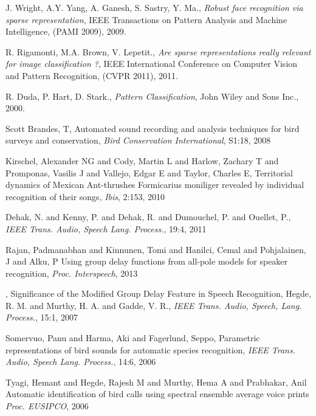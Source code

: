 \documentclass{article}
\begin{document}
\begin{thebibliography}{100}
J. Wright, A.Y. Yang, A. Ganesh, S. Sastry, Y. Ma., \emph{Robust face recognition via sparse representation}, IEEE Transactions on Pattern Analysis and Machine Intelligence, (PAMI 2009), 2009. 

R. Rigamonti, M.A. Brown, V. Lepetit., \emph{Are sparse representations really relevant for image classification ?}, IEEE International Conference on Computer Vision and Pattern Recognition, (CVPR 2011), 2011. 

R. Duda, P. Hart, D. Stark., \emph{Pattern Classification}, John Wiley and Sons Inc., 2000. 











Scott Brandes, T, Automated sound recording and analysis techniques for
bird surveys and conservation, \emph{Bird Conservation International}, S1:18, 2008

Kirschel, Alexander NG and Cody, Martin L and Harlow, Zachary T and Promponas,
Vasilis J and Vallejo, Edgar E and Taylor, Charles E,
Territorial dynamics of Mexican Ant-thrushes Formicarius moniliger revealed by
individual recognition of their songs, \emph{Ibis}, 2:153, 2010

Dehak, N. and Kenny, P. and Dehak, R. and Dumouchel, P. and Ouellet, P.,
\emph{IEEE Trans. Audio, Speech Lang. Process.}, 19:4, 2011

Rajan, Padmanabhan and Kinnunen, Tomi and Hanilci, Cemal and Pohjalainen, J and Alku, P
Using group delay functions from all-pole models for speaker recognition,
\emph{Proc. Interspeech}, 2013

,
Significance of the Modified Group Delay Feature in Speech Recognition,
Hegde, R. M. and Murthy, H. A. and Gadde, V. R.,
\emph{IEEE Trans. Audio, Speech, Lang. Process.},
15:1, 2007

Somervuo, Panu and Harma, Aki and Fagerlund, Seppo,
Parametric representations of bird sounds for automatic species recognition,
\emph{IEEE Trans. Audio, Speech Lang. Process.}, 14:6, 2006


Tyagi, Hemant and Hegde, Rajesh M and Murthy, Hema A and Prabhakar, Anil
Automatic identification of bird calls using spectral ensemble average voice prints
\emph{Proc. EUSIPCO}, 2006


\end{thebibliography}
\end{document}
